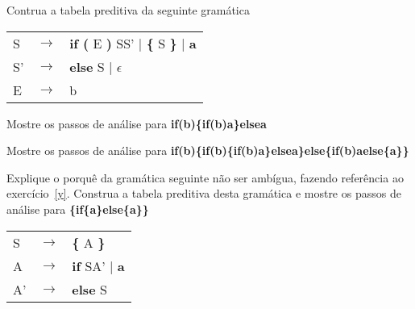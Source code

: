 \documentclass{compiladores}
\begin{document}
\begin{listanumerada}
\item Contrua a tabela preditiva da seguinte gramática \\
  \label{y}
    \begin{tabular}{lcl}
     S & $\rightarrow$ & {\bf if (} E {\bf )} SS' | {\bf \{} S {\bf\}} | {\bf a} \\
     S' & $\rightarrow$ & {\bf else} S | $\epsilon$ \\
     E & $\rightarrow$ & b\\
     \end{tabular}
    \begin{lista}
      \item Mostre os passos de análise para {\bf if(b)\{if(b)a\}elsea }
      \item Mostre os passos de análise para {\bf if(b)\{if(b)\{if(b)a\}elsea\}else\{if(b)aelse\{a\}\}}
    \end{lista}
\item Explique o porquê da gramática seguinte não ser ambígua, fazendo
  referência ao exercício~\ref{y}. Construa a tabela
  preditiva desta gramática e mostre os passos de análise para {\bf  \{if\{a\}else\{a\}\}} \\
    \begin{tabular}{lcl}
     S & $\rightarrow$ & {\bf \{} A {\bf \}} \\
     A & $\rightarrow$ & {\bf if} SA' | {\bf a} \\
     A' & $\rightarrow$ & {\bf else} S \\
     \end{tabular}

\end{listanumerada}
\end{document}
